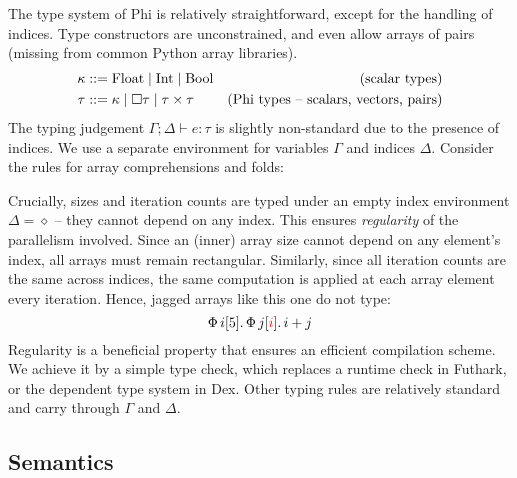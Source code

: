 The type system of Phi is relatively straightforward, except for the handling of indices. Type constructors are unconstrained, and even allow arrays of pairs (missing from common Python array libraries).
\begin{align*}
\kappa &::= \phifloattype \mid \phiinttype \mid \phibooltype & \text{(scalar types)} \\
\tau &::= \kappa \mid \phivectype{\tau} \mid \phipairtype{\tau}{\tau} & \text{(Phi types -- scalars, vectors, pairs)}
\end{align*}
The typing judgement $\Gamma; \Delta \vdash e : \tau$ is slightly non-standard due to the presence of indices. We use a separate environment for variables $\Gamma$ and indices $\Delta$. Consider the rules for array comprehensions and folds:
\begin{center}
    \begin{prooftree}[center=false]
    \end{prooftree} \quad
    \begin{prooftree}[center=false]
    \end{prooftree}
\end{center}
Crucially, sizes and iteration counts are typed under an empty index environment $\Delta = \diamond$ -- they cannot depend on any index. This ensures \textit{regularity} of the parallelism involved. Since an (inner) array size cannot depend on any element's index, all arrays must remain rectangular. Similarly, since all iteration counts are the same across indices, the same computation is applied at each array element every iteration. Hence, jagged arrays like this one do not type:
$$ \phivec{i}{5}{\phivec{j}{\textcolor{red}{i}}{i + j}} $$
Regularity is a beneficial property that ensures an efficient compilation scheme. We achieve it by a simple type check, which replaces a runtime check in Futhark, or the dependent type system in Dex. 
Other typing rules are relatively standard and carry through $\Gamma$ and $\Delta$. 

\subsection{Semantics}

